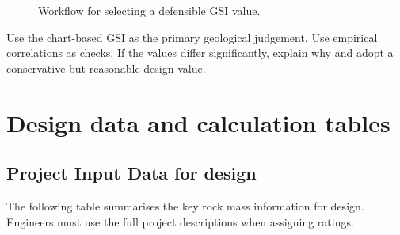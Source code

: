 \begin{figure}[H]
\centering
{}
\caption{Workflow for selecting a defensible GSI value.}
\label{fig:gsi_selection}
\end{figure}

\begin{keybox}
Use the chart-based GSI as the primary geological judgement. Use empirical correlations
as checks. If the values differ significantly, explain why and adopt a conservative but
reasonable design value.
\end{keybox}

\section{Design data and calculation tables}
\label{sec:ch3-design-data}

\subsection{Project Input Data for design}

The following table summarises the key rock mass information for design.
Engineers must use the full project descriptions when assigning
ratings.

